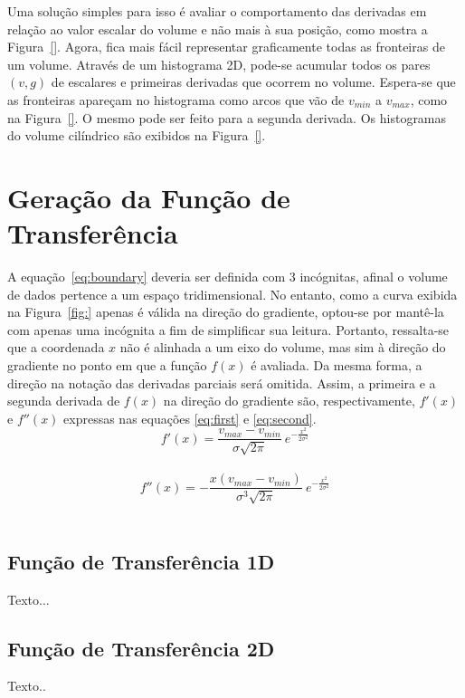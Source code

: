 	Uma solução simples para isso é avaliar o comportamento das derivadas em relação ao valor escalar do volume e não mais à sua posição, como mostra a Figura~\ref{}. Agora, fica mais fácil representar graficamente todas as fronteiras de um volume. Através de um histograma 2D, pode-se acumular todos os pares $(v,g)$ de escalares e primeiras derivadas que ocorrem no volume. Espera-se que as fronteiras apareçam no histograma como arcos que vão de $v_{min}$ a $v_{max}$, como na Figura~\ref{}. O mesmo pode ser feito para a segunda derivada. Os histogramas do volume cilíndrico são exibidos na Figura~\ref{}.
    
\section{Geração da Função de Transferência}
\label{gordon.ft}
	A equação~\eqref{eq:boundary} deveria ser definida com 3 incógnitas, afinal o volume de dados pertence a um espaço tridimensional. No entanto, como a curva exibida na Figura~\ref{fig:} apenas é válida na direção do gradiente, optou-se por mantê-la com apenas uma incógnita a fim de simplificar sua leitura. Portanto, ressalta-se que a coordenada $x$ não é alinhada a um eixo do volume, mas sim à direção do gradiente no ponto em que a função $f(x)$ é avaliada. Da mesma forma, a direção na notação das derivadas parciais será omitida. Assim, a primeira e a segunda derivada de $f(x)$ na direção do gradiente são, respectivamente, $f'(x)$ e $f''(x)$ expressas nas equações \eqref{eq:first} e \eqref{eq:second}. \\
	
\begin{equation} \label{eq:first}
	f'(x) = \frac{v_{max} - v_{min}}{\sigma\sqrt{2\pi}}\ e^{-\frac{x^{2}}{2\sigma^{2}}}
\end{equation} \\

\begin{equation} \label{eq:second}
	f''(x) = -\frac{x(v_{max} - v_{min})}{\sigma^{3}\sqrt{2\pi}}\ e^{-\frac{x^{2}}{2\sigma^{2}}}
\end{equation} \\
	
\subsection{Função de Transferência 1D}
\label{gordon.1d}
	Texto...
    
\subsection{Função de Transferência 2D}
\label{gordon.2d}    
    Texto..
    
